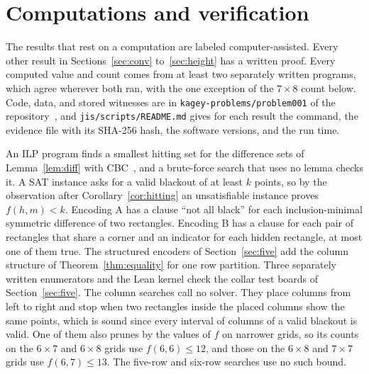 \section{Computations and verification}\label{sec:verify}

The results that rest on a computation are labeled computer-assisted. Every other result in
Sections~\ref{sec:conv} to~\ref{sec:height} has a written proof. Every computed value and count
comes from at least two separately written programs, which agree wherever both ran, with the one
exception of the $7\times8$ count below. Code, data, and stored witnesses are in
\nolinkurl{kagey-problems/problem001} of the repository~\cite{repo}, and
\nolinkurl{jis/scripts/README.md} gives for each result the command, the evidence file with its
SHA-256 hash, the software versions, and the run time.

An ILP program finds a smallest hitting set for the difference sets of Lemma~\ref{lem:diff} with
CBC~\cite{cbc}, and a brute-force search that uses no lemma checks it. A SAT instance asks for a
valid blackout of at least $k$ points, so by the observation after Corollary~\ref{cor:hitting} an
unsatisfiable instance proves $f(h,m)<k$. Encoding A has a clause ``not all black'' for each
inclusion-minimal symmetric difference of two rectangles. Encoding B has a clause for each pair of
rectangles that share a corner and an indicator for each hidden rectangle, at most one of them
true. The structured encoders of Section~\ref{sec:five} add the column structure of
Theorem~\ref{thm:equality} for one row partition. Three separately written enumerators and the
Lean kernel check the collar test boards of Section~\ref{sec:five}. The column searches call no
solver. They place columns from left to right and stop when two rectangles inside the placed
columns show the same points, which is sound since every interval of columns of a valid blackout
is valid. One of them also prunes by the values of $f$ on narrower grids, so its counts on the
$6\times7$ and $6\times8$ grids use $f(6,6)\le12$, and those on the $6\times8$ and $7\times7$
grids use $f(6,7)\le13$. The five-row and six-row searches use no such bound.


